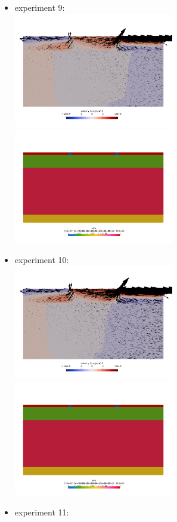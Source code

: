 \newpage
\begin{itemize}
\item experiment 9:\\
\includegraphics[width=7cm]{python_codes/fieldstone_148/results/vels_0008}
\includegraphics[width=7cm]{python_codes/fieldstone_148/results/etas_0008}
\item experiment 10:\\
\includegraphics[width=7cm]{python_codes/fieldstone_148/results/vels_0009}
\includegraphics[width=7cm]{python_codes/fieldstone_148/results/etas_0009}
\item experiment 11:\\

\end{itemize}
